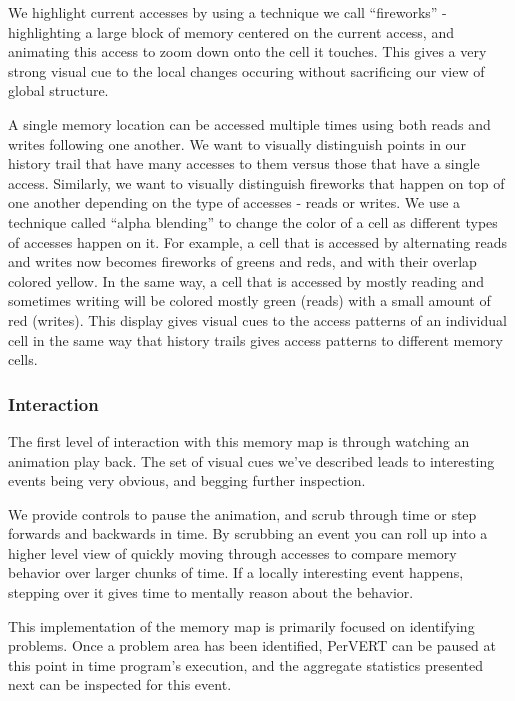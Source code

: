 \documentclass[annual]{acmsiggraph}
\begin{document}
  
  We highlight current accesses by using a technique we call ``fireworks'' - highlighting a large block of memory centered on the current access, and animating this access to zoom down onto the cell it touches. This gives a very strong visual cue to the local changes occuring without sacrificing our view of global structure.
  
  A single memory location can be accessed multiple times using both reads and writes following one another. We want to visually distinguish points in our history trail that have many accesses to them versus those that have a single access. Similarly, we want to visually distinguish fireworks that happen on top of one another depending on the type of accesses - reads or writes. We use a technique called ``alpha blending'' to change the color of a cell as different types of accesses happen on it. For example, a cell that is accessed by alternating reads and writes now becomes fireworks of greens and reds, and with their overlap colored yellow. In the same way, a cell that is accessed by mostly reading and sometimes writing will be colored mostly green (reads) with a small amount of red (writes). This display gives visual cues to the access patterns of an individual cell in the same way that history trails gives access patterns to different memory cells.
  
  \subsubsection{Interaction}
    The first level of interaction with this memory map is through watching an animation play back. The set of visual cues we've described leads to interesting events being very obvious, and begging further inspection.
    
    We provide controls to pause the animation, and scrub through time or step forwards and backwards in time. By scrubbing an event you can roll up into a higher level view of quickly moving through accesses to compare memory behavior over larger chunks of time. If a locally interesting event happens, stepping over it gives time to mentally reason about the behavior.
    
    This implementation of the memory map is primarily focused on identifying problems. Once a problem area has been identified, PerVERT can be paused at this point in time program's execution, and the aggregate statistics presented next can be inspected for this event.
  
\end{document}
